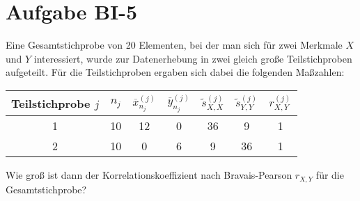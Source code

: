 
\section{Aufgabe BI-5}

\begin{task}
    Eine Gesamtstichprobe von 20 Elementen, bei der man sich für zwei Merkmale $X$ und $Y$ interessiert, wurde zur Datenerhebung in zwei gleich große Teilstichproben aufgeteilt. Für die Teilstichproben ergaben sich dabei die folgenden Maßzahlen:

    \begin{table}[H]
    \centering
    \begin{tabular}{c|cccccc}
        Teilstichprobe $j$ & $n_j$ & $\overline{x}_{n_j}^{(j)}$ & $\overline{y}_{n_j}^{(j)}$ & $\tilde{s}_{X,X}^{(j)}$ & $\tilde{s}_{Y,Y}^{(j)}$ & $r_{X,Y}^{(j)}$ \\ \hline
        1 & 10 & 12 & 0 & 36 & 9  & 1 \\
        2 & 10 & 0  & 6 & 9  & 36 & 1
    \end{tabular}
    \end{table}

    Wie groß ist dann der Korrelationskoeffizient nach Bravais-Pearson $r_{X,Y}$ für die Gesamtstichprobe?
\end{task}
